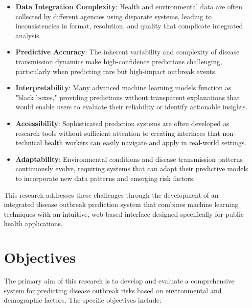 \documentclass[12pt,a4paper]{report}
\begin{document}
\begin{itemize}
    \item \textbf{Data Integration Complexity}: Health and environmental data are often collected by different agencies using disparate systems, leading to inconsistencies in format, resolution, and quality that complicate integrated analysis.
    
    \item \textbf{Predictive Accuracy}: The inherent variability and complexity of disease transmission dynamics make high-confidence predictions challenging, particularly when predicting rare but high-impact outbreak events.
    
    \item \textbf{Interpretability}: Many advanced machine learning models function as "black boxes," providing predictions without transparent explanations that would enable users to evaluate their reliability or identify actionable insights.
    
    \item \textbf{Accessibility}: Sophisticated prediction systems are often developed as research tools without sufficient attention to creating interfaces that non-technical health workers can easily navigate and apply in real-world settings.
    
    \item \textbf{Adaptability}: Environmental conditions and disease transmission patterns continuously evolve, requiring systems that can adapt their predictive models to incorporate new data patterns and emerging risk factors.
\end{itemize}

This research addresses these challenges through the development of an integrated disease outbreak prediction system that combines machine learning techniques with an intuitive, web-based interface designed specifically for public health applications.

\section{Objectives}
The primary aim of this research is to develop and evaluate a comprehensive system for predicting disease outbreak risks based on environmental and demographic factors. The specific objectives include:
\end{document}
